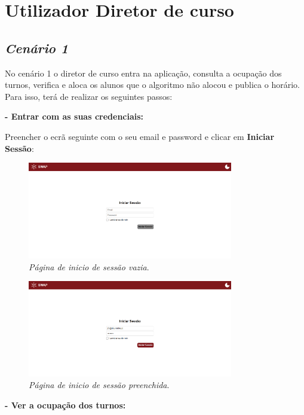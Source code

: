 \documentclass[12pt, a4paper]{article}
\begin{document}
\section*{Utilizador Diretor de curso}

\subsection{\emph{Cenário 1}}

No cenário 1 o diretor de curso entra na aplicação, consulta a ocupação dos turnos, verifica
e aloca os alunos que o algoritmo não alocou e publica o horário. Para isso, terá de realizar
os seguintes passos:

\textbf{- Entrar com as suas credenciais:}

Preencher o ecrã seguinte com o seu email e password e clicar em \textbf{Iniciar Sessão}:

\begin{figure}[H]
    \centering
    \includegraphics[width=0.8\textwidth]{res/manual/pagina_login_vazia.png}
    \caption{\emph{Página de inicio de sessão vazia}.}
    \label{login_vazio}
\end{figure}

\begin{figure}[H]
    \centering
    \includegraphics[width=0.8\textwidth]{res/manual/login_diretor.png}
    \caption{\emph{Página de inicio de sessão preenchida}.}
    \label{login_diretor}
\end{figure}

\textbf{- Ver a ocupação dos turnos:}
\end{document}
